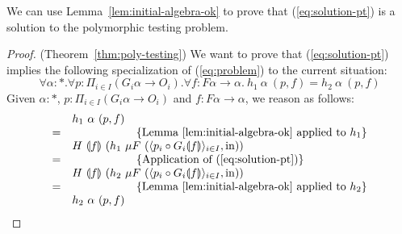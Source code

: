 \documentclass{llncs}
\newcommand{\fold}[1]{\llparenthesis #1 \rrparenthesis} %
\newcommand{\eqAnnotation}[1]{\hspace{2cm}\left\{\textrm{#1}\right\}}
\begin{document}
We can use Lemma~\ref{lem:initial-algebra-ok} to prove that
(\ref{eq:solution-pt}) is a solution to the polymorphic testing
problem.

\begin{proof}
(Theorem~\ref{thm:poly-testing}) We want to prove that
  (\ref{eq:solution-pt}) implies the following specialization of
  (\ref{eq:problem}) to the current situation: 
  \begin{displaymath}
    \forall \alpha : *. \forall p : \Pi_{i \in I}(G_i\alpha \to
    O_i). \forall f : F\alpha \to \alpha.~h_1~\alpha~(p,f) =
    h_2~\alpha~(p,f)
  \end{displaymath}
  Given $\alpha : *$, $p : \Pi_{i \in I}(G_i\alpha \to O_i)$ and $f :
  F\alpha \to \alpha$, we reason as follows:
  \begin{displaymath}
    \begin{array}{cl}
       & h_1~\alpha~(p,f) \\
       =&\eqAnnotation{Lemma \ref{lem:initial-algebra-ok} applied to $h_1$} \\
       &H~\fold{f}~(h_1~\mu F~(\langle p_i \circ G_i\fold{f}
       \rangle_{i \in I}, \mathrm{in})) \\ 
       =&\eqAnnotation{Application of (\ref{eq:solution-pt})} \\
       &H~\fold{f}~(h_2~\mu F~(\langle p_i \circ G_i\fold{f}
       \rangle_{i \in I}, \mathrm{in})) \\ 
       =&\eqAnnotation{Lemma \ref{lem:initial-algebra-ok} applied to
         $h_2$} \\ 
       &h_2~\alpha~(p,f)
    \end{array}
  \end{displaymath}
\end{proof}



\end{document}
